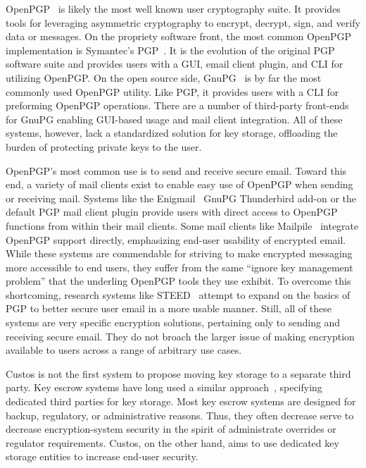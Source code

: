 OpenPGP~\cite{openpgp} is likely the most well known user cryptography
suite. It provides tools for leveraging asymmetric cryptography to
encrypt, decrypt, sign, and verify data or messages. On the propriety
software front, the most common OpenPGP implementation is Symantec's
PGP~\cite{pgp}. It is the evolution of the original PGP software suite
and provides users with a GUI, email client plugin, and CLI for
utilizing OpenPGP. On the open source side, GnuPG~\cite{gnupg} is by
far the most commonly used OpenPGP utility. Like PGP, it provides
users with a CLI for preforming OpenPGP operations. There are a number
of third-party front-ends for GnuPG enabling GUI-based usage and mail
client integration. All of these systems, however, lack a standardized
solution for key storage, offloading the burden of protecting private
keys to the user.

OpenPGP's most common use is to send and receive secure email. Toward
this end, a variety of mail clients exist to enable easy use of
OpenPGP when sending or receiving mail. Systems like the
Enigmail~\cite{enigmail} GnuPG Thunderbird add-on or the default PGP
mail client plugin provide users with direct access to OpenPGP
functions from within their mail clients. Some mail clients like
Mailpile~\cite{mailpile} integrate OpenPGP support directly,
emphasizing end-user usability of encrypted email. While these systems
are commendable for striving to make encrypted messaging more
accessible to end users, they suffer from the same ``ignore key
management problem'' that the underling OpenPGP tools they use
exhibit. To overcome this shortcoming, research systems like
STEED~\cite{Koch2011} attempt to expand on the basics of PGP to better
secure user email in a more usable manner. Still, all of these systems
are very specific encryption solutions, pertaining only to sending and
receiving secure email. They do not broach the larger issue of making
encryption available to users across a range of arbitrary use cases.

Custos is not the first system to propose moving key storage to a
separate third party. Key escrow systems have long used a similar
approach~\cite{Blaze1996, Denning1996}, specifying dedicated third
parties for key storage. Most key escrow systems are designed for
backup, regulatory, or administrative reasons. Thus, they often
decrease serve to decrease encryption-system security in the spirit of
administrate overrides or regulator requirements. Custos, on the other
hand, aims to use dedicated key storage entities to increase end-user
security.

